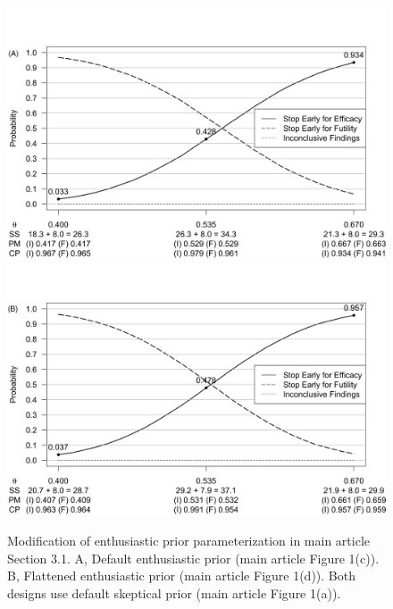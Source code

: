 \documentclass[useAMS,usenatbib,referee]{biom}
\begin{document}
\begin{figure}\begin{center}


 \includegraphics[width=6in]{figureS2c.png}
 \includegraphics[width=6in]{figureS2d.png}
 \caption{Modification of enthusiastic prior parameterization in main article Section 3.1. A, Default enthusiastic prior (main article Figure 1(c)). B, Flattened enthusiastic prior (main article Figure 1(d)). Both designs use default skeptical prior (main article Figure 1(a)).}
\label{fig:robustness2}
\end{center}
\end{figure}

 

\vspace*{-8pt}
\label{lastpage}
\end{document}

